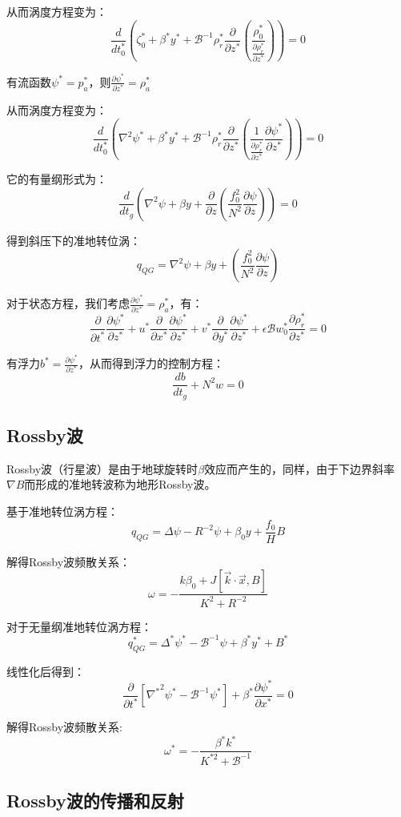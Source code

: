 \documentclass{article}
\begin{document}
从而涡度方程变为：
$$\frac{d }{d t_0^*}(\zeta_0^*+ \beta^*y^*
+ \mathcal{B}^{-1}\rho_r^*\frac{\partial}{\partial z^*}(\frac{\rho_0^*}{\frac{\partial \rho_r^*}{\partial z^*}}))
=  0$$

有流函数$\psi^* = p_a^*$，则$\frac{\partial \psi^*}{\partial z^*}=\rho_a^*$

从而涡度方程变为：
$$\frac{d }{d t_0^*}(\nabla^2\psi^* + \beta^*y^*
+ \mathcal{B}^{-1}\rho_r^*\frac{\partial}{\partial z^*}
(\frac{1}{\frac{\partial \rho_r^*}{\partial z^*}}
\frac{\partial \psi^*}{\partial z^*}))
=  0$$

它的有量纲形式为：
$$\frac{d }{d t_g}(\nabla^2\psi + \beta y
+ \frac{\partial}{\partial z}
(\frac{f_0^2}{N^2}
\frac{\partial \psi}{\partial z}))
=  0$$

得到斜压下的准地转位涡：
$$q_{QG} = \nabla^2\psi + \beta y + (\frac{f_0^2}{N^2}
\frac{\partial \psi}{\partial z})$$

对于状态方程，我们考虑$\frac{\partial \psi^*}{\partial z^*}=\rho_a^*$，有：
$$\frac{\partial }{\partial t^*}\frac{\partial \psi^*}{\partial z^*}
+ u^*\frac{\partial }{\partial x^*}\frac{\partial \psi^*}{\partial z^*}
+ v^*\frac{\partial }{\partial y^*}\frac{\partial \psi^*}{\partial z^*}
+ \epsilon\mathcal{B}w_0^* \frac{\partial \rho_r^*}{\partial z^*} = 0$$

有浮力$b^* = \frac{\partial \psi^*}{\partial z^*}$，从而得到浮力的控制方程：
$$\frac{db}{dt_g}+N^2w=0$$

\subsection{Rossby波}
Rossby波（行星波）是由于地球旋转时$\beta$效应而产生的，同样，由于下边界斜率$\nabla B$而形成的准地转波称为地形Rossby波。

基于准地转位涡方程：
$$q_{QG} = \Delta \psi-R^{-2}\psi+\beta_0y+\frac{f_0}{H}B$$

解得Rossby波频散关系：
$$\omega = -\frac{k\beta_0+J[\vec{k}\cdot\vec{x}, B]}{K^2+R^{-2}}$$

对于无量纲准地转位涡方程：
$$q_{QG}^* = \Delta^*\psi^*-\mathcal{B}^{-1}\psi+\beta^*y^*+B^*$$

线性化后得到：
$$\frac{\partial }{\partial {{t}^{*}}}\left[ {{\nabla }^{*}}^{2}{{\psi }^{*}}-{{\mathcal{B}}^{-1}}{{\psi }^{*}} \right]+{{\beta }^{*}}\frac{\partial {{\psi }^{*}}}{\partial {{x}^{*}}}=0$$

解得Rossby波频散关系:
$$\omega^*=-\frac{\beta^*k^*}{K^{*2}+\mathcal{B}^{-1}}$$

\subsection{Rossby波的传播和反射}
\end{document}
